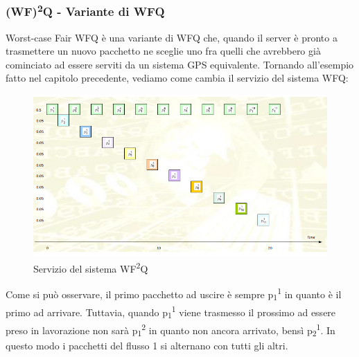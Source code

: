 \documentclass{article}
\begin{document}

\newpage
\subsubsection{(WF)\textsuperscript{2}Q - Variante di WFQ}
Worst-case Fair WFQ è una variante di WFQ che, quando il server è pronto a trasmettere un nuovo pacchetto ne sceglie uno fra quelli che avrebbero già cominciato ad essere serviti da un sistema GPS equivalente. Tornando all'esempio fatto nel capitolo precedente, vediamo come cambia il servizio del sistema WFQ:
\begin{figure}[H]
    \centering
    \includegraphics[scale=2]{figures/fairness3.jpg}
    \caption{Servizio del sistema WF\textsuperscript{2}Q}
\end{figure}
Come si può osservare, il primo pacchetto ad uscire è sempre p\textsubscript{1}\textsuperscript{1} in quanto è il primo ad arrivare. Tuttavia, quando p\textsubscript{1}\textsuperscript{1} viene trasmesso il prossimo ad essere preso in lavorazione non sarà p\textsubscript{1}\textsuperscript{2} in quanto non ancora arrivato, bensì p\textsubscript{2}\textsuperscript{1}. In questo modo i pacchetti del flusso 1 si alternano con tutti gli altri.

\newpage
\end{document}
